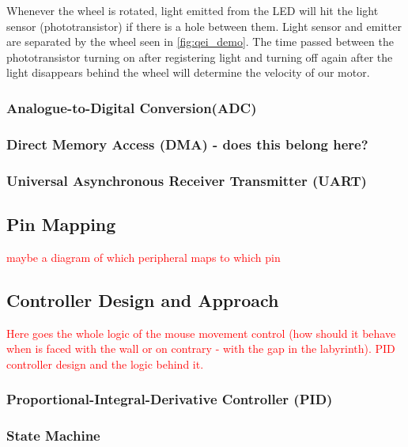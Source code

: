 Whenever the wheel is rotated, light emitted from the LED will hit the light sensor (phototransistor) if there is a hole between them. Light sensor and emitter are separated by the wheel seen in \ref{fig:qei_demo}.
The time passed between the phototransistor turning on after registering light and turning off again after the light disappears behind the wheel will determine the velocity of our motor.


\subsubsection*{Analogue-to-Digital Conversion(ADC)}

\subsubsection*{Direct Memory Access (DMA) - does this belong here?}

\subsubsection*{Universal Asynchronous Receiver Transmitter (UART)}


\subsection{Pin Mapping}
\textcolor{red}{
maybe a diagram of which peripheral maps to which pin
}


\subsection{Controller Design and Approach}

\textcolor{red}{
Here goes the whole logic of the mouse movement control (how should it behave when is faced with the wall or on contrary - with the gap in the labyrinth). PID controller design and the logic behind it.
}

\subsubsection{Proportional-Integral-Derivative Controller (PID)}

\subsubsection{State Machine}



